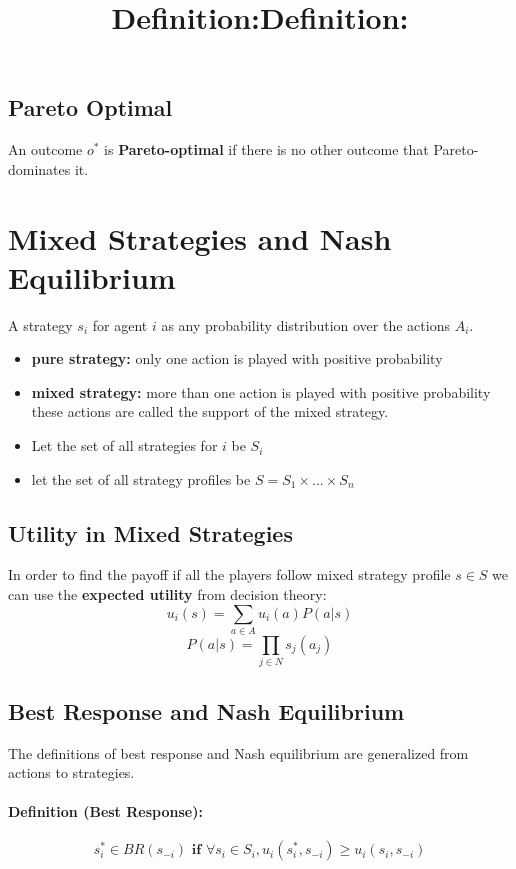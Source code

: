 \subsection{Pareto Optimal}
\title{\textbf{Definition:}}
An outcome $o^*$ is \textbf{Pareto-optimal} if there is no other outcome that Pareto-dominates it.

\section{Mixed Strategies and Nash Equilibrium}
\title{\textbf{Definition:}}
A strategy $s_i$ for agent $i$ as any probability distribution over the actions $A_i$.
\begin{itemize}
\item \textbf{pure strategy:} only one action is played with positive probability
\item \textbf{mixed strategy:} more than one action is played with positive probability
\bigbreak
these actions are called the support of the mixed strategy.
\item Let the set of all strategies for $i$ be $S_i$
\item let the set of all strategy profiles be $S = S_1 \times... \times S_n$
\end{itemize}

\subsection{Utility in Mixed Strategies}
In order to find the payoff if all the players follow mixed strategy profile $s \in S$ we can use the \textbf{expected utility} from decision theory: 
\begin{equation} u_i(s) = \sum_{a \in A}u_i(a)P(a|s)\end{equation}
\begin{equation} P(a|s) = \prod_{j \in N}s_j(a_j)\end{equation}

\subsection{Best Response and Nash Equilibrium}The definitions of best response and Nash equilibrium are generalized from actions to strategies. 
\paragraph{Definition (Best Response): }
\begin{equation}
s_i^* \in BR(s_{-i}) \textbf{ if }   \forall s_i \in S_i, u_i(s_i^*,s_{-i}) \geq u_i(s_i, s_{-i})
\end{equation}
